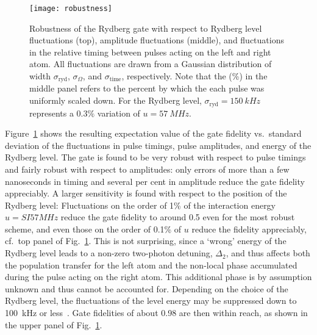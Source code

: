 \begin{figure}[tb]
  \centering
  \texttt{[image: robustness]}
  \caption{%
    Robustness of the Rydberg gate with respect
    to Rydberg level fluctuations (top), amplitude fluctuations
    (middle), and fluctuations in the relative timing between
    pulses acting on the left and right atom. All fluctuations are
    drawn from a Gaussian distribution of width $\sigma_{\text{ryd}}$,
    $\sigma_{\Omega}$, and $\sigma_{\text{time}}$, respectively. Note
    that the (\%) in the middle panel refers to the percent by which the
    each pulse was uniformly scaled down. For the Rydberg level,
    $\sigma_{\text{ryd}} = \SI{150}{kHz}$ represents a $0.3\%$ variation of
    $u=\SI{57}{MHz}$.}
  \label{fig:pulserobust}
\end{figure}
Figure~\ref{fig:pulserobust} shows the resulting expectation value of the
gate fidelity vs.\ standard
deviation of the fluctuations in pulse timings, pulse amplitudes,
and energy of the Rydberg level.
The gate is found to be very robust with respect to pulse timings
and fairly robust with respect to amplitudes: only errors of more
than a few nanoseconds in timing and several per cent in amplitude
reduce the gate fidelity appreciably.
A larger sensitivity is found with respect to the position of the Rydberg level:
Fluctuations on the order of 1\% of the interaction energy $u=SI{57}{MHz}$ reduce
the gate fidelity to around 0.5 even for the most robust scheme, and even those
on the order of 0.1\% of $u$ reduce the fidelity appreciably, cf.\ top
panel of Fig.~\ref{fig:pulserobust}. This is not surprising, since a
`wrong' energy of the Rydberg level leads to a non-zero two-photon
detuning, $\Delta_2$, and thus affects both the population
transfer for the left atom and the non-local phase accumulated during
the pulse acting on the right atom. This additional phase is by assumption
unknown and thus cannot be accounted for. Depending on the choice of the
Rydberg level, the fluctuations of the level energy may be
suppressed down to \SI{100}{kHz} or less~\cite{Saffman_pc}.
Gate fidelities of about 0.98 are then
within reach, as shown in the upper panel of Fig.~\ref{fig:pulserobust}.

